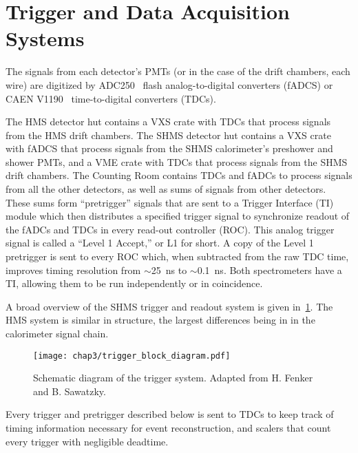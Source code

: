 \section{Trigger and Data Acquisition Systems}
\label{sec:daq}

The signals from each detector's PMTs (or in the case of the drift chambers,
each wire) are digitized by ADC250~\cite{fADC_manual} flash analog-to-digital
converters (fADCS) or CAEN V1190~\cite{CAEN_1190_manual} time-to-digital
converters (TDCs).

The HMS detector hut contains a VXS crate with TDCs that process signals from
the HMS drift chambers.
The SHMS detector hut contains a VXS crate with fADCS that process signals from
the SHMS calorimeter's preshower and shower PMTs, and a VME crate with TDCs
that process signals from the SHMS drift chambers.
The Counting Room contains TDCs and fADCs to process signals from all the other
detectors, as well as sums of signals from other detectors.
These sums form ``pretrigger'' signals that are sent to a Trigger Interface
(TI) module which then distributes a specified trigger signal to synchronize
readout of the fADCs and TDCs in every read-out controller (ROC).
This analog trigger signal is called a ``Level 1 Accept,'' or L1 for short.
A copy of the Level 1 pretrigger is sent to every ROC which, when subtracted
from the raw TDC time, improves timing resolution from $\sim$\SI{25}{ns} to
$\sim$\SI{0.1}{ns}.
Both spectrometers have a TI, allowing them to be run independently or in
coincidence.


A broad overview of the SHMS trigger and readout system is given
in~\ref{fig:trigger_block_diagram}.
The HMS system is similar in structure, the largest differences being in in the
calorimeter signal chain.

\begin{figure}[!h]
    \centering
    \texttt{[image: chap3/trigger\_block\_diagram.pdf]}
    \caption[Schematic diagram of the trigger system.]{Schematic diagram of the trigger system.
             Adapted from H. Fenker and B. Sawatzky.
             }
    \label{fig:trigger_block_diagram}
\end{figure}

Every trigger and pretrigger described below is sent to TDCs to keep track of
timing information necessary for event reconstruction, and scalers that count
every trigger with negligible deadtime.

